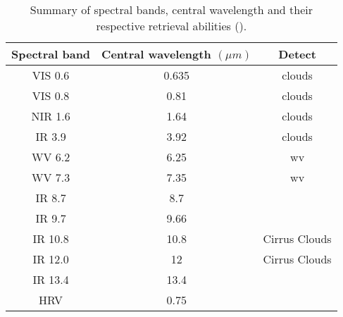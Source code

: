 \begin{table}[ht]
    \centering
    \setlength\extrarowheight{-7pt}
    \begin{tabular}{c|c|c}
        Spectral band & Central wavelength $\left( \mu m  \right)$ & Detect \\ \hline
        VIS 0.6 & 0.635 & clouds \\
        VIS 0.8 & 0.81  & clouds \\
        NIR 1.6 & 1.64  & clouds \\
        IR 3.9 & 3.92  & clouds  \\
        WV 6.2 & 6.25 & \acrlong{wv} \\
        WV 7.3 & 7.35 & \acrlong{wv} \\ 
        IR 8.7 & 8.7 & \\
        IR 9.7 & 9.66 & \\
        IR 10.8 & 10.8 & Cirrus Clouds \\
        IR 12.0 & 12 & Cirrus Clouds\\
        IR 13.4 & 13.4 & \\
        HRV & 0.75 & 
    \end{tabular}
    \caption{Summary of spectral bands, central wavelength and their respective retrieval abilities (\cite{Schmetz_meteosat_intro}).}
    \label{tab:msg_spectral_bands}
\end{table}